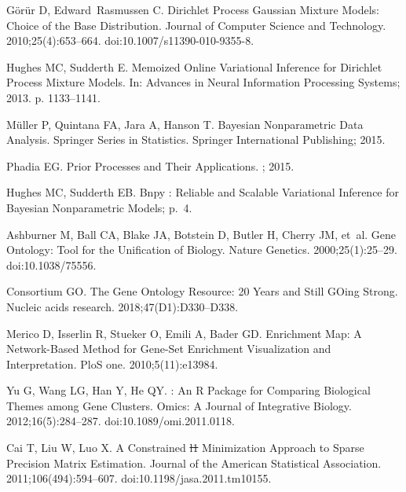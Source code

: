 \documentclass[10pt,letterpaper]{article}
\providecommand{\DIFaddtex}[1]{{\protect\color{blue}\uwave{#1}}} %
\providecommand{\DIFdeltex}[1]{{\protect\color{red}\sout{#1}}}                      %
\providecommand{\DIFaddbegin}{} %
\providecommand{\DIFaddend}{} %
\providecommand{\DIFdelbegin}{} %
\providecommand{\DIFdelend}{} %
\providecommand{\DIFadd}[1]{\texorpdfstring{\DIFaddtex{#1}}{#1}} %
\providecommand{\DIFdel}[1]{\texorpdfstring{\DIFdeltex{#1}}{}} %
\newcommand{\DIFscaledelfig}{0.5}
\newlength{\DIFdelgraphicswidth} %
\newlength{\DIFdelgraphicsheight} %
\newcommand{\DIFaddincludegraphics}[2][]{{\color{blue}\fbox{\DIFOincludegraphics[#1]{#2}}}} %
\newcommand{\DIFdelincludegraphics}[2][]{%
\sbox{\DIFdelgraphicsbox}{\DIFOincludegraphics[#1]{#2}}%
\settoboxwidth{\DIFdelgraphicswidth}{\DIFdelgraphicsbox} %
\settoboxtotalheight{\DIFdelgraphicsheight}{\DIFdelgraphicsbox} %
\scalebox{\DIFscaledelfig}{%
\parbox[b]{\DIFdelgraphicswidth}{\usebox{\DIFdelgraphicsbox}\\[-\baselineskip] \rule{\DIFdelgraphicswidth}{0em}}\llap{\resizebox{\DIFdelgraphicswidth}{\DIFdelgraphicsheight}{%
\setlength{\unitlength}{\DIFdelgraphicswidth}%
\begin{picture}(1,1)%
\thicklines\linethickness{2pt} %
{\color[rgb]{1,0,0}\put(0,0){\framebox(1,1){}}}%
{\color[rgb]{1,0,0}\put(0,0){\line( 1,1){1}}}%
{\color[rgb]{1,0,0}\put(0,1){\line(1,-1){1}}}%
\end{picture}%
}\hspace*{3pt}}} %
} %
\DeclareRobustCommand{\DIFaddbegin}{\DIFOaddbegin \let\includegraphics\DIFaddincludegraphics} %
\DeclareRobustCommand{\DIFaddend}{\DIFOaddend \let\includegraphics\DIFOincludegraphics} %
\DeclareRobustCommand{\DIFdelbegin}{\DIFOdelbegin \let\includegraphics\DIFdelincludegraphics} %
\DeclareRobustCommand{\DIFdelend}{\DIFOaddend \let\includegraphics\DIFOincludegraphics} %
\begin{document}
\begin{thebibliography}{10}
	G{\"o}r{\"u}r D, Edward~Rasmussen C.
	\newblock Dirichlet {{Process Gaussian Mixture Models}}: {{Choice}} of the
	{{Base Distribution}}.
	\newblock Journal of Computer Science and Technology. 2010;25(4):653--664.
	\newblock doi:{10.1007/s11390-010-9355-8}.

	Hughes MC, Sudderth E.
	\newblock Memoized Online Variational Inference for {{Dirichlet}} Process
	Mixture Models.
	\newblock In: Advances in Neural Information Processing Systems; 2013. p.
	1133--1141.

	M{\"u}ller P, Quintana FA, Jara A, Hanson T.
	\newblock Bayesian {{Nonparametric Data Analysis}}.
	\newblock Springer {{Series}} in {{Statistics}}. {Springer International
		Publishing}; 2015.

	Phadia EG.
	\newblock Prior Processes and Their Applications.
	; 2015.

	Hughes MC, Sudderth EB.
	\newblock Bnpy : {{Reliable}} and Scalable Variational Inference for
	{{Bayesian}} Nonparametric Models; p.~4.

	Ashburner M, Ball CA, Blake JA, Botstein D, Butler H, Cherry JM, et~al.
	\newblock Gene {{Ontology}}: Tool for the Unification of Biology.
	\newblock Nature Genetics. 2000;25(1):25--29.
	\newblock doi:{10.1038/75556}.

	Consortium GO.
	\newblock The Gene Ontology Resource: 20 Years and Still {{GOing}} Strong.
	\newblock Nucleic acids research. 2018;47(D1):D330--D338.

	Merico D, Isserlin R, Stueker O, Emili A, Bader GD.
	\newblock Enrichment Map: A Network-Based Method for Gene-Set Enrichment
	Visualization and Interpretation.
	\newblock PloS one. 2010;5(11):e13984.

	Yu G, Wang LG, Han Y, He QY.
	: An {{R}} Package for Comparing Biological Themes
	among Gene Clusters.
	\newblock Omics: A Journal of Integrative Biology. 2012;16(5):284--287.
	\newblock doi:{10.1089/omi.2011.0118}.

	Cai T, Liu W, Luo X.
	\newblock A {{Constrained}} \DIFdelbegin \DIFdel{l1 }\DIFdelend \DIFaddbegin {\DIFadd{$l$}}\DIFadd{1 }\DIFaddend {{Minimization Approach}} to
	{{Sparse Precision Matrix Estimation}}.
	\newblock Journal of the American Statistical Association.
	2011;106(494):594--607.
	\newblock doi:{10.1198/jasa.2011.tm10155}.


\end{thebibliography}
\end{document}
